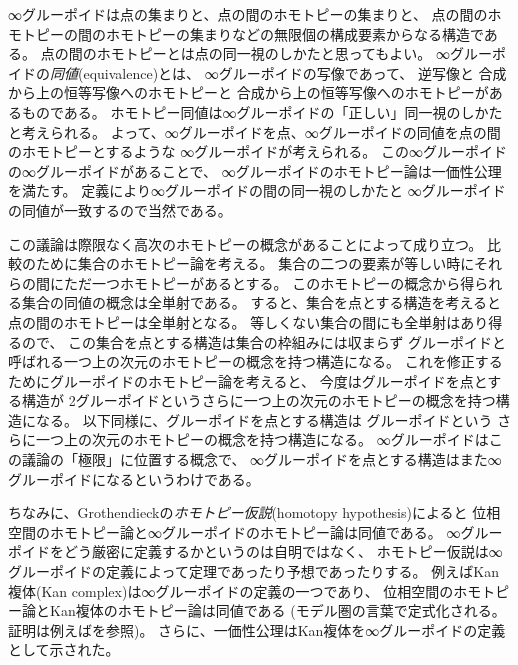 \documentclass[index]{subfiles}
\begin{document}
∞グルーポイドは点の集まりと、点の間のホモトピーの集まりと、
点の間のホモトピーの間のホモトピーの集まりなどの無限個の構成要素からなる構造である。
点の間のホモトピーとは点の同一視のしかたと思ってもよい。
∞グルーポイドの\emph{同値}(equivalence)とは、
∞グルーポイドの写像であって、
逆写像と
合成から上の恒等写像へのホモトピーと
合成から上の恒等写像へのホモトピーがあるものである。
ホモトピー同値は∞グルーポイドの「正しい」同一視のしかたと考えられる。
よって、∞グルーポイドを点、∞グルーポイドの同値を点の間のホモトピーとするような
∞グルーポイドが考えられる。
この∞グルーポイドの∞グルーポイドがあることで、
∞グルーポイドのホモトピー論は一価性公理を満たす。
定義により∞グルーポイドの間の同一視のしかたと
∞グルーポイドの同値が一致するので当然である。

この議論は際限なく高次のホモトピーの概念があることによって成り立つ。
比較のために集合のホモトピー論を考える。
集合の二つの要素が等しい時にそれらの間にただ一つホモトピーがあるとする。
このホモトピーの概念から得られる集合の同値の概念は全単射である。
すると、集合を点とする構造を考えると点の間のホモトピーは全単射となる。
等しくない集合の間にも全単射はあり得るので、
この集合を点とする構造は集合の枠組みには収まらず
グルーポイドと呼ばれる一つ上の次元のホモトピーの概念を持つ構造になる。
これを修正するためにグルーポイドのホモトピー論を考えると、
今度はグルーポイドを点とする構造が
2グルーポイドというさらに一つ上の次元のホモトピーの概念を持つ構造になる。
以下同様に、グルーポイドを点とする構造は
グルーポイドという
さらに一つ上の次元のホモトピーの概念を持つ構造になる。
∞グルーポイドはこの議論の「極限」に位置する概念で、
∞グルーポイドを点とする構造はまた∞グルーポイドになるというわけである。

ちなみに、Grothendieckの\emph{ホモトピー仮説}(homotopy hypothesis)によると
位相空間のホモトピー論と∞グルーポイドのホモトピー論は同値である。
∞グルーポイドをどう厳密に定義するかというのは自明ではなく、
ホモトピー仮説は∞グルーポイドの定義によって定理であったり予想であったりする。
例えばKan複体(Kan complex)は∞グルーポイドの定義の一つであり、
位相空間のホモトピー論とKan複体のホモトピー論は同値である
(モデル圏の言葉で定式化される。
証明は例えばを参照)。
さらに、一価性公理はKan複体を∞グルーポイドの定義として示された。
\end{document}
